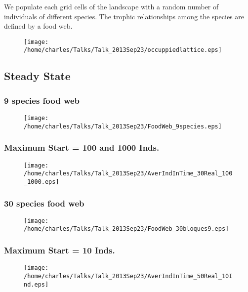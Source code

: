 \documentclass[xcolor=x11names,compress]{beamer}
\renewcommand{\(}{\begin{columns}}
\renewcommand{\)}{\end{columns}}
\newcommand{\<}[1]{\begin{column}{#1}}
\renewcommand{\>}{\end{column}}
\begin{document}
\begin{frame}
\centering We populate each grid cells of the landscape with a random number of individuals of different species. The trophic relationships among the species are defined by a food web.
\begin{figure}
\centering \texttt{[image: /home/charles/Talks/Talk\_2013Sep23/occuppiedlattice.eps]}
\end{figure}
\end{frame}

\subsection{Steady State}


\begin{frame}
\frametitle{9 species food web}
\begin{figure}
\texttt{[image: /home/charles/Talks/Talk\_2013Sep23/FoodWeb\_9species.eps]}
\end{figure}
\end{frame}


\begin{frame}
\frametitle{Maximum Start = 100 and 1000 Inds.}
\begin{figure}
\texttt{[image: /home/charles/Talks/Talk\_2013Sep23/AverIndInTime\_30Real\_100\_1000.eps]}
\end{figure}
\end{frame}


\begin{frame}
\frametitle{30 species food web}
\begin{figure}
\texttt{[image: /home/charles/Talks/Talk\_2013Sep23/FoodWeb\_30bloques9.eps]}
\end{figure}
\end{frame}

\begin{frame}
\frametitle{Maximum Start = 10 Inds.}
\begin{figure}
\texttt{[image: /home/charles/Talks/Talk\_2013Sep23/AverIndInTime\_50Real\_10Ind.eps]}
\end{figure}
\end{frame}
\end{document}
